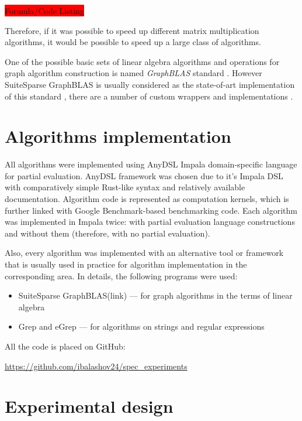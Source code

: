 \documentclass[conference]{IEEEtran}
\begin{document}
\colorbox{red}{Formula/Code Listing}
\bigskip

Therefore, if it was possible to speed up different matrix multiplication algorithms, it would be possible to speed up a large class of algorithms. 

One of the possible basic sets of linear algebra algorithms and operations for graph algorithm construction is named \textit{GraphBLAS} standard \cite{davis2019algorithm,moreira2018implementing}. However SuiteSparse GraphBLAS is usually considered as the state-of-art implementation of this standard \cite{davis2019algorithm}, there are a number of custom wrappers and implementations \cite{pygraphblas, ibmgraphblas}.

\section{Algorithms implementation}

All algorithms were implemented using AnyDSL Impala domain-specific language \cite{leissa2018anydsl} for partial evaluation. AnyDSL framework was chosen due to it's Impala DSL with comparatively simple Rust-like syntax and relatively available documentation. Algorithm code is represented as computation kernels, which is further linked with Google Benchmark-based \cite{gbenchmark} benchmarking code. Each algorithm was implemented in Impala twice: with partial evaluation language constructions and without them (therefore, with no partial evaluation).

Also, every algorithm was implemented with an alternative tool or framework that is usually used in practice for algorithm implementation in the corresponding area. In details, the following programs were used:
\begin{itemize}
	\item SuiteSparse GraphBLAS(link) --- for graph algorithms in the terms of linear algebra
	\item Grep and eGrep --- for algorithms on strings and regular expressions
\end{itemize}


All the code is placed on GitHub:
\begin{center}
\href{https://github.com/ibalashov24/spec\_experiments}{https://github.com/ibalashov24/spec\_experiments}
\end{center}

\section{Experimental design}
\end{document}
